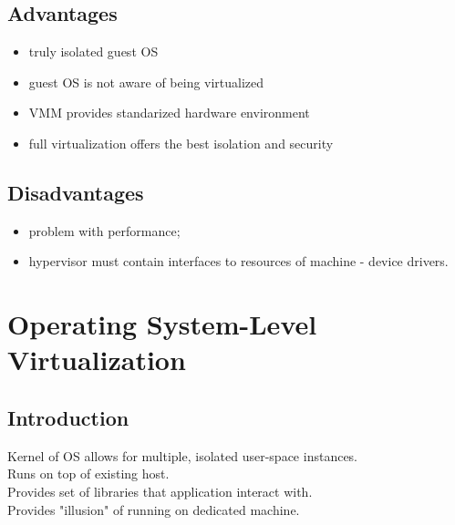 \documentclass{beamer}
\begin{document}
\subsection{Advantages}
\begin{frame}
\begin{itemize}
\item truly isolated guest OS
\pause
\item guest OS is not aware of being virtualized
\pause
\item VMM provides standarized hardware environment
\pause
\item full virtualization offers the best isolation and security
\end{itemize}
\end{frame}

\subsection{Disadvantages}
\begin{frame}
\begin{itemize}
\item problem with performance;
\item hypervisor must contain interfaces to resources of machine - device drivers.
\end{itemize}
\end{frame}

\section{Operating System-Level Virtualization}
\subsection{Introduction}
\begin{frame}
Kernel of OS allows for multiple, isolated user-space instances. \\
\pause
Runs on top of existing host. \\
\pause
Provides set of libraries that application interact with. \\
\pause
Provides "illusion" of running on dedicated machine.
\end{frame}
\end{document}
